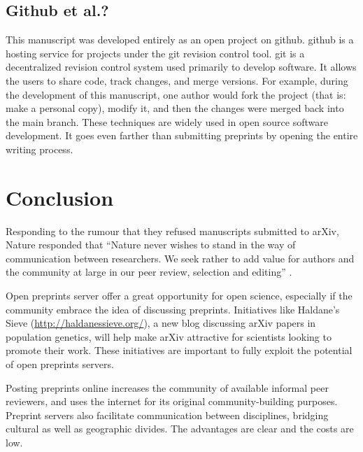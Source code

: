 \documentclass[letterpaper,twocolumn,superscriptaddress,showkeys]{revtex4}
\begin{document}
\subsection{Github et al.?}

This manuscript was developed entirely as an open project on github. github is a
hosting service for projects under the git revision control tool. git is a
decentralized revision control system used primarily to develop software. It
allows the users to share code, track changes, and merge versions. For example,
during the development of this manuscript, one author would fork the project
(that is: make a personal copy), modify it, and then the changes were merged
back into the main branch. These techniques are widely used in open source
software development. It goes even farther than submitting preprints by opening
the entire writing process. 

\section{Conclusion}

Responding to the rumour that they refused manuscripts submitted to arXiv,
Nature responded that ``Nature never wishes to stand in the way of communication
between researchers. We seek rather to add value for authors and the community
at large in our peer review, selection and editing'' \cite{nat05}.

Open preprints server offer a great opportunity for open science, especially if
the community embrace the idea of discussing preprints. Initiatives like
Haldane's Sieve (\href{http://haldanessieve.org/}{http://haldanessieve.org/}), a
new blog discussing arXiv papers in population genetics, will help make arXiv
attractive for scientists looking to promote their work. These initiatives are
important to fully exploit the potential of open preprints servers.

Posting preprints online increases the community of available informal peer
reviewers, and uses the internet for its original community-building purposes.
Preprint servers also facilitate communication between disciplines, bridging
cultural as well as geographic divides. The advantages are clear and the costs
are low.
\end{document}
